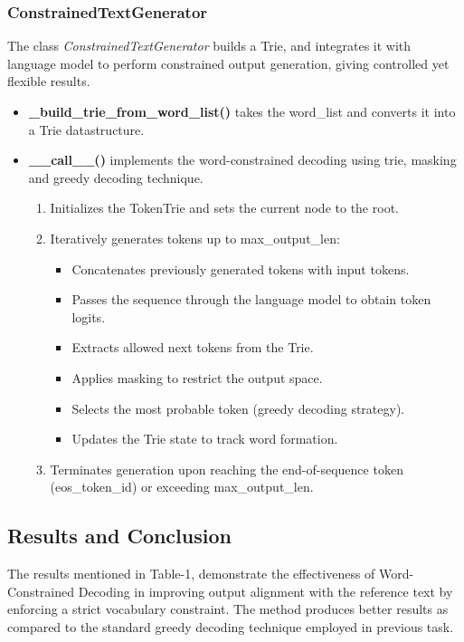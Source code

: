 \documentclass{article}
\begin{document}
\subsubsection{ConstrainedTextGenerator}
The class \textit{ConstrainedTextGenerator} builds a Trie, and integrates it with language model to perform constrained output generation, giving controlled yet flexible results.
\begin{itemize}
    \item \textbf{\_build\_trie\_from\_word\_list()} takes the word\_list and converts it into a Trie datastructure.
    \item \textbf{\_\_call\_\_()} implements the word-constrained decoding using trie, masking and greedy decoding technique. 
    \begin{enumerate}
        \item Initializes the TokenTrie and sets the current node to the root.
        \item Iteratively generates tokens up to max\_output\_len:
        \begin{itemize}
            \item Concatenates previously generated tokens with input tokens.
            \item Passes the sequence through the language model to obtain token logits.
            \item Extracts allowed next tokens from the Trie.
            \item Applies masking to restrict the output space.
            \item Selects the most probable token (greedy decoding strategy).
            \item Updates the Trie state to track word formation.
        \end{itemize}
        \item Terminates generation upon reaching the end-of-sequence token (eos\_token\_id) or exceeding max\_output\_len.
    \end{enumerate}
\end{itemize}

\subsection{Results and Conclusion}
The results mentioned in Table-1, demonstrate the effectiveness of Word-Constrained Decoding in improving output alignment with the reference text by enforcing a strict vocabulary constraint. The method produces better results as compared to the standard greedy decoding technique employed in previous task.
\end{document}

